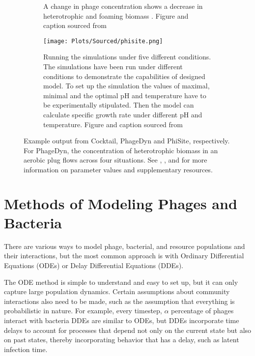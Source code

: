 \begin{figure}
\begin{subfigure}{0.32\linewidth}
{            A change in phage concentration shows a decrease in heterotrophic and foaming biomass \cite{krysiak-baltynSimulationPhageDynamics2017}. 
            Figure and caption sourced from \cite{krysiak-baltynSimulationPhageDynamics2017}
        }
        \label{fig:sourced:phagedyn_plot}
    \end{subfigure}
    \hfill
    \begin{subfigure}{0.32\linewidth}
        \centering
        \captionsetup{width=1\linewidth}
        \texttt{[image: Plots/Sourced/phisite.png]}
        \caption{
            Running the simulations under five different conditions.
            The simulations have been run under different conditions to demonstrate the capabilities of designed model. To set up the simulation the values of maximal, minimal and the optimal pH and temperature have to be experimentally stipulated. 
            Then the model can calculate specific growth rate under different pH and temperature. 
            Figure and caption sourced from \citet{bekeModellingInteractionBacteriophages2016}
        }
        \label{fig:sourced:phisite_plot}
    \end{subfigure}
    \caption{Example output from Cocktail, PhageDyn and PhiSite, respectively. For PhageDyn, the concentration of heterotrophic biomass in an aerobic plug flows across four situations.
        See \citet{nilssonCocktailComputerProgram2022}, \citet{krysiak-baltynSimulationPhageDynamics2017}, and \citet{bekeModellingInteractionBacteriophages2016} for more information on parameter values and supplementary resources. 
    }
    \label{fig:sourced:cocktail_and_phagedyn}
\end{figure}

\section{Methods of Modeling Phages and Bacteria}
There are various ways to model phage, bacterial, and resource populations and their interactions, but the most common approach is with Ordinary Differential Equations (ODEs) or Delay Differential Equations (DDEs). 

The ODE method is simple to understand and easy to set up, but it can only capture large population dynamics.
Certain assumptions about community interactions also need to be made, such as the assumption that everything is probabilistic in nature.
For example, every timestep, $\alpha$ percentage of phages interact with  bacteria
DDEs are similar to ODEs, but DDEs incorporate time delays to account for processes that depend not only on the current state but also on past states, thereby incorporating behavior that has a delay, such as latent infection time. 

